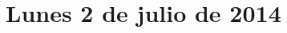 \documentclass[12pt,spanish]{article}
\begin{document}
  \thispagestyle{empty}
  \pagestyle{empty}
  \section*{Lunes 2 de julio de 2014}

  
\end{document}
